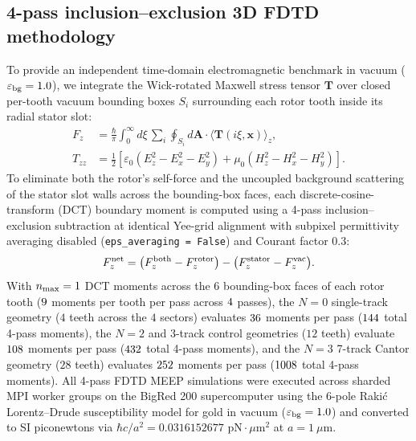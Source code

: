 \documentclass[pdflatex,sn-nature]{sn-jnl}
\begin{document}
\subsection*{4-pass inclusion--exclusion 3D FDTD methodology}
To provide an independent time-domain electromagnetic benchmark in vacuum ($\varepsilon_{\rm bg}=1.0$), we integrate the Wick-rotated Maxwell stress tensor $\mathbf{T}$ over closed per-tooth vacuum bounding boxes $S_i$ surrounding each rotor tooth inside its radial stator slot\cite{rodriguez2009pra,oskooi2010,rodriguez2011}:
\begin{equation}
\begin{aligned}
F_z &= \frac{\hbar}{\pi} \int_0^\infty d\xi \, \sum_{i} \oint_{S_i} d\mathbf{A} \cdot \langle \mathbf{T}(i\xi, \mathbf{x}) \rangle_z, \\
T_{zz} &= \frac{1}{2} \left[ \varepsilon_0 (E_z^2 - E_x^2 - E_y^2) + \mu_0 (H_z^2 - H_x^2 - H_y^2) \right].
\end{aligned}
\label{eq:methods_fdtd}
\end{equation}
To eliminate both the rotor's self-force and the uncoupled background scattering of the stator slot walls across the bounding-box faces, each discrete-cosine-transform (DCT) boundary moment is computed using a 4-pass inclusion--exclusion subtraction at identical Yee-grid alignment with subpixel permittivity averaging disabled (\texttt{eps\_averaging = False}) and Courant factor $0.3$:
\begin{equation}
F_z^{\rm net} = \bigl(F_z^{\rm both} - F_z^{\rm rotor}\bigr) - \bigl(F_z^{\rm stator} - F_z^{\rm vac}\bigr).
\label{eq:methods_four_pass}
\end{equation}
With $n_{\rm max}=1$ DCT moments across the $6$ bounding-box faces of each rotor tooth ($9{}$ moments per tooth per pass across $4{}$ passes), the $N=0$ single-track geometry ($4$ teeth across the $4$ sectors) evaluates $36{}$ moments per pass ($144{}$ total 4-pass moments), the $N=2$ and 3-track control geometries ($12$ teeth) evaluate $108{}$ moments per pass ($432{}$ total 4-pass moments), and the $N=3$ 7-track Cantor geometry ($28$ teeth) evaluates $252{}$ moments per pass ($1008{}$ total 4-pass moments). All 4-pass FDTD MEEP simulations were executed across sharded MPI worker groups on the BigRed 200 supercomputer using the 6-pole Raki\'c Lorentz--Drude susceptibility model for gold\cite{rakic1998} in vacuum ($\varepsilon_{\rm bg}=1.0$) and converted to SI piconewtons via $\hbar c / a^2 = 0.0316152677\text{ pN}\cdot\mu\text{m}^2$ at $a = 1\ \mu\text{m}$.
\end{document}

